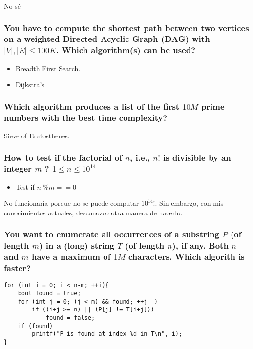 \documentclass{article}
\begin{document}
No sé

\subsubsection{You have to compute the shortest path between two vertices on a weighted Directed Acyclic Graph (DAG) with $|V|, |E| \leq 100 K$. Which algorithm(s) can be used?}

\begin{itemize}
  \item Breadth First Search.
  \item Dijkstra's
\end{itemize}

\subsubsection{Which algorithm produces a list of the first $10M$ prime numbers with the best time complexity?}

Sieve of Eratosthenes.

\subsubsection{How to test if the factorial of $n$, i.e., $n!$ is divisible by an integer $m$ ? $1 \leq n \leq 10^{14}$}

\begin{itemize}
  \item Test if $n! \% m == 0$
\end{itemize}

No funcionaría porque no se puede computar $10^{14}!$. Sin embargo, con mis conocimientos actuales, desconozco otra manera de hacerlo.

\subsubsection{You want to enumerate all occurrences of a substring $P$ (of length $m$) in a (long) string $T$ (of length $n$), if any. Both $n$ and $m$ have a maximum of $1M$ characters. Which algorith is faster?  }


\begin{lstlisting}
for (int i = 0; i < n-m; ++i){
    bool found = true;
    for (int j = 0; (j < m) && found; ++j  )
        if ((i+j >= n) || (P[j] != T[i+j]))
            found = false;
    if (found)
        printf("P is found at index %d in T\n", i);
}
\end{lstlisting}
\end{document}
